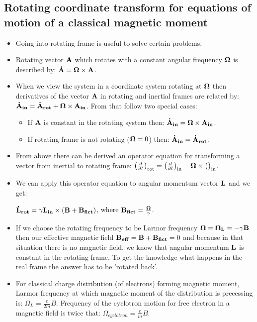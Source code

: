 \documentclass[AtomicOptical1Notes.tex]{subfiles}
\begin{document}
	\subsection{Rotating coordinate transform for equations of motion of a classical magnetic moment}
		\begin{itemize}
			\item Going into rotating frame is useful to solve certain problems.
			\item Rotating vector $\mathbf{A}$ which rotates with a constant angular frequency $\mathbf{\Omega}$ is described by: $\dot{\mathbf{A}}=\mathbf{\Omega}\times\mathbf{A}$.
			\item When we view the system in a coordinate system rotating at $\mathbf{\Omega}$ then derivatives of the vector $\mathbf{A}$ in rotating and inertial frames are related by: $ \mathbf{\dot A_{in}} = \mathbf{\dot A_{rot}} + \mathbf{\Omega}\times\mathbf{A_{in}} $. From that follow two special cases: 
				\begin{itemize}
					\item If $\mathbf{A}$ is constant in the rotating system then: $ \mathbf{\dot A_{in}} = \mathbf{\Omega}\times\mathbf{A_{in}} $.
					\item If rotating frame is not rotating ($\mathbf{\Omega} = 0$) then: $ \mathbf{\dot A_{in}} = \mathbf{\dot A_{rot}} $.
				\end{itemize}
			\item From above there can be derived an operator equation for transforming a vector from inertial to rotating frame: $\left(\frac{d}{dt}\right)_\text{rot} = \left(\frac{d}{dt}\right)_\text{in} - {\bf{\Omega}} \times\big(\big)_\text{in}$.
			\item We can apply this operator equation to angular momentum vector $\mathbf{L}$ and we get:
			
			$ \mathbf{\dot L_{rot}} = \gamma\mathbf{L_{in}}\times(\mathbf{B}+\mathbf{B_{fict}}) $, where $ \mathbf{B_{fict}}=\frac{\mathbf{\Omega}}{\gamma} $.
			\item If we choose the rotating frequency to be Larmor frequency $\mathbf{\Omega} = \mathbf{\Omega_L} = -\gamma\mathbf{B}$ then our effective magnetic field $ \mathbf{B_{eff}} = \mathbf{B}+\mathbf{B_{fict}} = 0 $ and because in that situation there is no magnetic field, we know that angular momentum $\mathbf{L}$ is constant in the rotating frame. To get the knowledge what happens in the real frame the answer has to be 'rotated back'.
			\item For classical charge distribution (of electrons) forming magnetic moment, Larmor frequency at which magnetic moment of the distribution is precessing is: $\Omega_L = \frac{e}{2m}B$. Frequency of the cyclotron motion for free electron in a magnetic field is twice that: $\Omega_{cyclotron} = \frac{e}{m}B$.
		\end{itemize}
	
\end{document}
